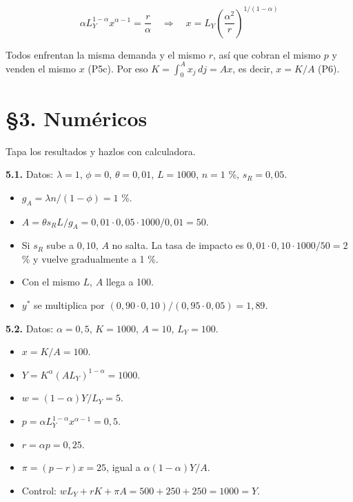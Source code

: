 \documentclass[11pt,a4paper]{article}
\begin{document}
\begin{equation*}\alpha L_Y^{1-\alpha} x^{\alpha-1} = \frac{r}{\alpha} \quad\Rightarrow\quad x = L_Y \left(\frac{\alpha^2}{r}\right)^{1/(1-\alpha)}\end{equation*}

Todos enfrentan la misma demanda y el mismo $r$, así que cobran el mismo $p$ y venden el mismo $x$ (P5c). Por eso $K = \int_0^A x_j\,dj = Ax$, es decir, $x = K/A$ (P6).

\section*{§3. Numéricos}

Tapa los resultados y hazlos con calculadora.

\textbf{5.1.} Datos: $\lambda = 1$, $\phi = 0$, $\theta = 0{,}01$, $L = 1000$, $n = 1$ \%, $s_R = 0{,}05$.

\begin{itemize}[leftmargin=*,itemsep=2pt,topsep=2pt]
\item $g_A = \lambda n/(1-\phi) = 1$ \%.
\item $A = \theta s_R L/g_A = 0{,}01 \cdot 0{,}05 \cdot 1000/0{,}01 = 50$.
\item Si $s_R$ sube a $0{,}10$, $A$ no salta. La tasa de impacto es $0{,}01 \cdot 0{,}10 \cdot 1000/50 = 2$ \% y vuelve gradualmente a 1 \%.
\item Con el mismo $L$, $A$ llega a 100.
\item $y^*$ se multiplica por $(0{,}90 \cdot 0{,}10)/(0{,}95 \cdot 0{,}05) = 1{,}89$.
\end{itemize}

\textbf{5.2.} Datos: $\alpha = 0{,}5$, $K = 1000$, $A = 10$, $L_Y = 100$.

\begin{itemize}[leftmargin=*,itemsep=2pt,topsep=2pt]
\item $x = K/A = 100$.
\item $Y = K^\alpha (AL_Y)^{1-\alpha} = 1000$.
\item $w = (1-\alpha)Y/L_Y = 5$.
\item $p = \alpha L_Y^{1-\alpha} x^{\alpha-1} = 0{,}5$.
\item $r = \alpha p = 0{,}25$.
\item $\pi = (p-r)x = 25$, igual a $\alpha(1-\alpha)Y/A$.
\item Control: $wL_Y + rK + \pi A = 500 + 250 + 250 = 1000 = Y$.
\end{itemize}
\end{document}
